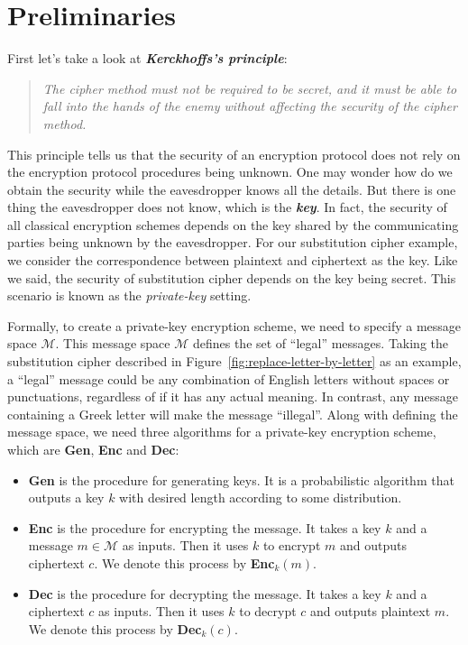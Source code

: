 \section{Preliminaries}
\par First let's take a look at \textbf{\textit{Kerckhoffs's principle}}:
\begin{quote}
    \textit{The cipher method must not be required to be secret, and it must be able to fall into the hands of the enemy without affecting the security of the cipher method.}
\end{quote}
This principle tells us that the security of an encryption protocol does not rely on the encryption protocol procedures being unknown. One may wonder how do we obtain the security while the eavesdropper knows all the details. But there is one thing the eavesdropper does not know, which is the \textbf{\textit{key}}. In fact, the security of all classical encryption schemes depends on the key shared by the communicating parties being unknown by the eavesdropper. For our substitution cipher example, we consider the correspondence between plaintext and ciphertext as the key. Like we said, the security of substitution cipher depends on the key being secret. This scenario is known as the \textit{private-key} setting.
\par Formally, to create a private-key encryption scheme, we need to specify a message space $\mathcal{M}$. This message space $\mathcal{M}$ defines the set of ``legal'' messages. Taking the substitution cipher described in Figure~\ref{fig:replace-letter-by-letter} as an example, a ``legal'' message could be any combination of English letters without spaces or punctuations, regardless of if it has any actual meaning. In contrast, any message containing a Greek letter will make the message  ``illegal''. Along with defining the message space, we need three algorithms for a private-key encryption scheme, which are \textbf{Gen}, \textbf{Enc} and \textbf{Dec}:
\begin{itemize}
    \item \textbf{Gen} is the procedure for generating keys. It is a probabilistic algorithm that outputs a key $k$ with desired length according to some distribution.
    \item \textbf{Enc} is the procedure for encrypting the message. It takes a key $k$ and a message $m \in \mathcal{M}$ as inputs. Then it uses $k$ to encrypt $m$ and outputs ciphertext $c$. We denote this process by \textbf{Enc}$_k(m)$.
    \item \textbf{Dec} is the procedure for decrypting the message. It takes a key $k$ and a ciphertext $c$ as inputs. Then it uses $k$ to decrypt $c$ and outputs plaintext $m$. We denote this process by \textbf{Dec}$_k(c)$.
\end{itemize}
